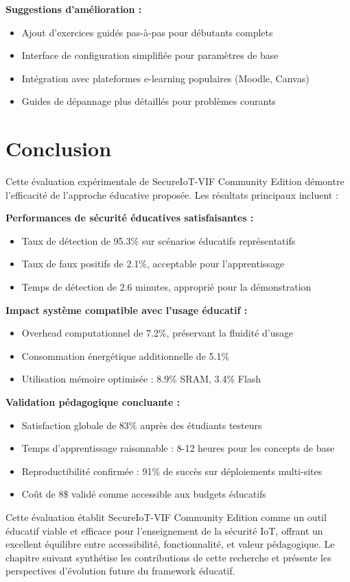 \textbf{Suggestions d'amélioration :}
\begin{itemize}
    \item Ajout d'exercices guidés pas-à-pas pour débutants complets
    \item Interface de configuration simplifiée pour paramètres de base
    \item Intégration avec plateformes e-learning populaires (Moodle, Canvas)
    \item Guides de dépannage plus détaillés pour problèmes courants
\end{itemize}

\section{Conclusion}

Cette évaluation expérimentale de SecureIoT-VIF Community Edition démontre l'efficacité de l'approche éducative proposée. Les résultats principaux incluent :

\textbf{Performances de sécurité éducatives satisfaisantes :}
\begin{itemize}
    \item Taux de détection de 95.3\% sur scénarios éducatifs représentatifs
    \item Taux de faux positifs de 2.1\%, acceptable pour l'apprentissage
    \item Temps de détection de 2.6 minutes, approprié pour la démonstration
\end{itemize}

\textbf{Impact système compatible avec l'usage éducatif :}
\begin{itemize}
    \item Overhead computationnel de 7.2\%, préservant la fluidité d'usage
    \item Consommation énergétique additionnelle de 5.1\%
    \item Utilisation mémoire optimisée : 8.9\% SRAM, 3.4\% Flash
\end{itemize}

\textbf{Validation pédagogique concluante :}
\begin{itemize}
    \item Satisfaction globale de 83\% auprès des étudiants testeurs
    \item Temps d'apprentissage raisonnable : 8-12 heures pour les concepts de base
    \item Reproductibilité confirmée : 91\% de succès sur déploiements multi-sites
    \item Coût de 8\$ validé comme accessible aux budgets éducatifs
\end{itemize}

Cette évaluation établit SecureIoT-VIF Community Edition comme un outil éducatif viable et efficace pour l'enseignement de la sécurité IoT, offrant un excellent équilibre entre accessibilité, fonctionnalité, et valeur pédagogique. Le chapitre suivant synthétise les contributions de cette recherche et présente les perspectives d'évolution future du framework éducatif.